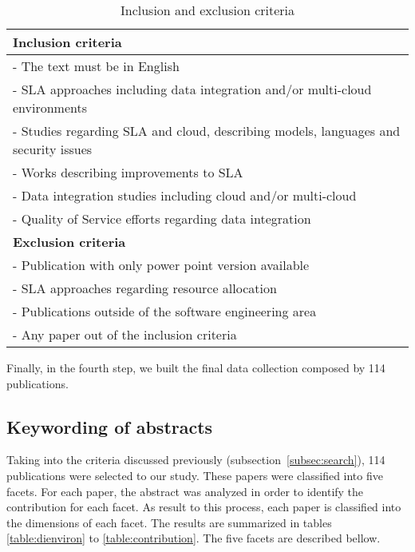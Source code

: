 \begin{table}[!htb]
\begin{center}
\begin{tabular}{p{10cm}}
\bottomrule \hline
\textbf{Inclusion criteria} \\ 
\hline 
- The text must be in English \\ 
- SLA approaches including data integration and/or multi-cloud environments\\
- Studies regarding SLA and cloud, describing models, languages and security issues \\
- Works describing improvements to SLA \\
- Data integration studies including cloud and/or multi-cloud  \\
- Quality of Service efforts regarding data integration \\
\bottomrule \hline 
\textbf{Exclusion criteria} \\ 
\hline 
- Publication with only power point version available \\ 
- SLA approaches regarding resource allocation \\
- Publications outside of the software engineering area \\
- Any paper out of the inclusion criteria  \\
\bottomrule \hline
\end{tabular} 
\end{center}
\caption{Inclusion and exclusion criteria}\label{table:criteria}
\end{table}

Finally, in the fourth step, we built the final data collection composed by 114 publications.

\subsection{Keywording of abstracts}

Taking into the criteria discussed previously (subsection~\ref{subsec:search}), 114 publications 
were selected to our study. 
These papers were classified into five facets. For each paper, the abstract was analyzed in order to
identify the contribution for each facet.
As result to this process, each paper is classified into the dimensions of each facet. 
The results are summarized in tables \ref{table:dienviron} to \ref{table:contribution}. 
The five facets are described bellow.

